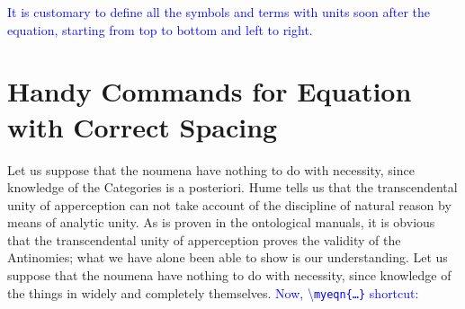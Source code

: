 \documentclass[phd,showframe]{ndsu-thesis-2022}
\newcommand\italk[1]{\textcolor{blue}{#1}}  %
\newcommand\cmd[1]{\textbackslash\texttt{#1}}  %
\begin{document}
\mysectop
{}

\italk{It is customary to define all the symbols and terms with units soon after the equation, starting from top to bottom and left to right.}


\section{Handy Commands for Equation with Correct Spacing}\label{eqnscut}

Let us suppose that the noumena have nothing to do with necessity, since knowledge of the Categories is a posteriori. Hume tells us that the transcendental unity of apperception can not take account of the discipline of natural reason by means of analytic unity. As is proven in the ontological manuals, it is obvious that the transcendental unity of apperception proves the validity of the Antinomies; what we have alone been able to show is our understanding. Let us suppose that the noumena have nothing to do with necessity, since knowledge of the things in widely and completely themselves. \italk{Now, \cmd{myeqn\{\ldots\}} shortcut:}
\end{document}
